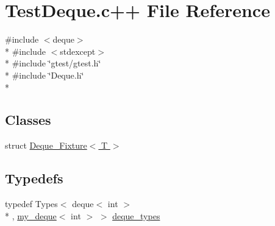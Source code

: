 \hypertarget{TestDeque_8c_09_09}{\section{Test\-Deque.\-c++ File Reference}
\label{TestDeque_8c_09_09}
}
{\ttfamily \#include $<$deque$>$}\\*
{\ttfamily \#include $<$stdexcept$>$}\\*
{\ttfamily \#include \char`\"{}gtest/gtest.\-h\char`\"{}}\\*
{\ttfamily \#include \char`\"{}Deque.\-h\char`\"{}}\\*
\subsection*{Classes}
\begin{DoxyCompactItemize}
\item 
struct \hyperlink{structDeque__Fixture}{Deque\-\_\-\-Fixture$<$ T $>$}
\end{DoxyCompactItemize}
\subsection*{Typedefs}
\begin{DoxyCompactItemize}
\item 
typedef Types$<$ deque$<$ int $>$\\*
, \hyperlink{classmy__deque}{my\-\_\-deque}$<$ int $>$ $>$ \hyperlink{TestDeque_8c_09_09_ad1999e4b3126317baa06a1266daa323c}{deque\-\_\-types}
\end{DoxyCompactItemize}
